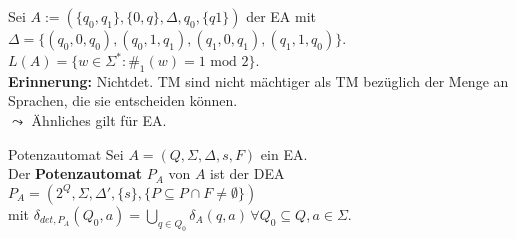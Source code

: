 \begin{exam}
    Sei $A := (\{q_0,q_1\},\{0,q\},\Delta,q_0,\{q1\})$ der EA mit \\
    $\Delta = \{(q_0,0,q_0),(q_0,1,q_1),(q_1,0,q_1),(q_1,1,q_0)\}$. \\


    $L(A) = \{w \in \Sigma^* : \#_1(w) = 1 \text{ mod } 2\}$. \\

    \textbf{Erinnerung:} Nichtdet. TM sind nicht mächtiger als TM bezüglich der Menge an Sprachen, die sie entscheiden können.\\


    $\leadsto$ Ähnliches gilt für EA.
\end{exam}

\begin{defn}{Potenzautomat}
        Sei $A = (Q,\Sigma,\Delta,s,F)$ ein EA. \\

        Der \textbf{Potenzautomat} $P_A$ von $A$ ist der DEA \\
        $P_A = (2^Q, \Sigma, \Delta', \{s\},\{P \subseteq P \cap F \neq \emptyset\})$ \\
        mit $\delta_{det,P_A}(Q_0,a) = \bigcup\limits_{q \in Q_0} \delta_A(q,a) \, \forall Q_0 \subseteq Q, a \in \Sigma$.
\end{defn}

